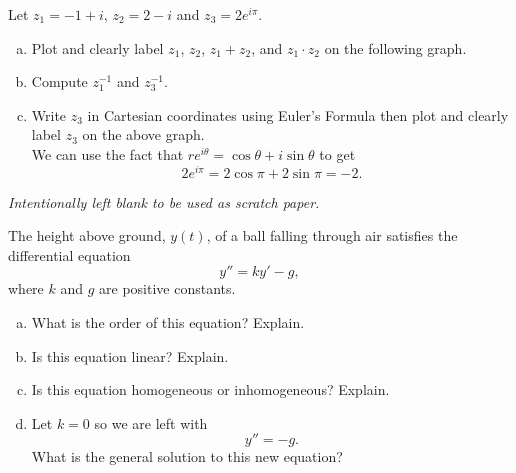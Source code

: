 \documentclass[12pt]{amsbook}
\begin{document}
\newpage
\begin{problem}
Let $z_1=-1+i$, $z_2=2-i$ and $z_3=2e^{i \pi}$.  
\begin{enumerate}[(a)]
    \item Plot and clearly label $z_1$, $z_2$, $z_1+z_2$, and $z_1\cdot z_2$ on the following graph.
    \begin{center}
    \end{center}
    \vspace*{1cm}
    \item Compute $z_1^{-1}$ and $z_3^{-1}$.
    \vspace*{8cm}
    \item Write $z_3$ in Cartesian coordinates using Euler's Formula then plot and clearly label $z_3$ on the above graph.\\
    We can use the fact that $re^{i\theta}=\cos\theta + i \sin \theta$ to get
    \[
    2e^{i\pi} = 2\cos \pi + 2 \sin \pi = -2.
    \]
\end{enumerate}
\end{problem}

\newpage
\emph{Intentionally left blank to be used as scratch paper.}\\


\newpage
\begin{problem}
The height above ground, $y(t)$, of a ball falling through air satisfies the differential equation
\[
y''=ky'-g,
\]
where $k$ and $g$ are positive constants.  
\begin{enumerate}[(a)]
    \item What is the order of this equation? Explain.
    \vspace*{3cm}
    \item Is this equation linear? Explain.
    \vspace*{3cm}
    \item Is this equation homogeneous or inhomogeneous? Explain.
    \vspace*{3cm}
    \item Let $k=0$ so we are left with
    \[
    y''=-g.
    \]
    What is the general solution to this new equation?
\end{enumerate}
\end{problem}
\end{document}
